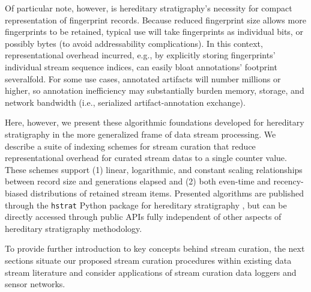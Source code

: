 Of particular note, however, is hereditary stratigraphy's necessity for compact representation of fingerprint records.
Because reduced fingerprint size allows more fingerprints to be retained, typical use will take fingerprints as individual bits, or possibly bytes (to avoid addressability complications).
In this context, representational overhead incurred, e.g., by explicitly storing fingerprints' individual stream sequence indices, can easily bloat annotations' footprint severalfold.
For some use cases, annotated artifacts will number millions or higher, so annotation inefficiency may substantially burden memory, storage, and network bandwidth (i.e., serialized artifact-annotation exchange).

Here, however, we present these algorithmic foundations developed for hereditary stratigraphy in the more generalized frame of data stream processing.
We describe a suite of indexing schemes for stream curation that reduce representational overhead for curated stream datas to a single counter value.
These schemes support (1) linear, logarithmic, and constant scaling relationships between record size and generations elapsed and (2) both even-time and recency-biased distributions of retained stream items.
Presented algorithms are published through the \texttt{hstrat} Python package for hereditary stratigraphy \citep{moreno2022hstrat}, but can be directly accessed through public APIs fully independent of other aspects of hereditary stratigraphy methodology.

To provide further introduction to key concepts behind stream curation, the next sections situate our proposed stream curation procedures within existing data stream literature and consider applications of stream curation data loggers and sensor networks.
